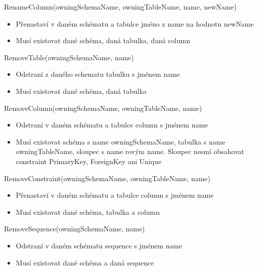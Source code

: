 \documentclass[11pt,twoside,a4paper]{book}
\begin{document}
\begin{list}{Operace :}{}
  \item RenameColumn(owningSchemaName, owningTableName, name, newName)
  \begin{itemize}
    \item Přenastaví v daném schématu a tabulce jméno z name na hodnotu newName
    \item  Musí existovat dané schéma, daná tabulka, daná column
  \end{itemize}

  \item RemoveTable(owningSchemaName, name)
  \begin{itemize}
    \item Odstraní z daného schematu tabulku s jménem name
    \item Musí existovat dané schéma, daná tabulka
  \end{itemize}

  \item RemoveColumn(owningSchemaName, owningTableName, name)
  \begin{itemize}
    \item Odstraní v daném schématu a tabulce column s jménem name
    \item Musí existovat schéma s name owningSchemaName, tabulka s name
    owningTableName, sloupec s name rovým name. Sloupec nesmí obsahovat
    constraint PrimaryKey, ForeignKey ani Unique
  \end{itemize}

  \item RemoveConstraint(owningSchemaName, owningTableName, name)
  \begin{itemize}
    \item Přenastaví v daném schématu a tabulce column s jménem name
    \item  Musí existovat dané schéma, tabulka a column
  \end{itemize}

  \item RemoveSequence(owningSchemaName, name)
  \begin{itemize}
    \item Odstraní v daném schématu sequence s jménem name
    \item Musí existovat dané schéma a daná sequence
  \end{itemize}


\end{list}
\end{document}
